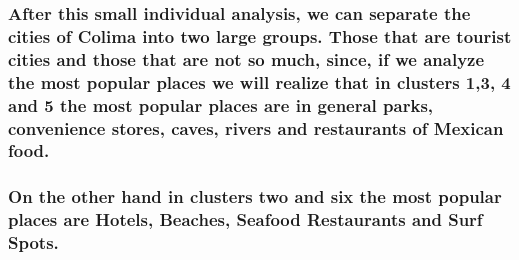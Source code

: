 \documentclass[11pt]{article}
\begin{document}
    \hypertarget{after-this-small-individual-analysis-we-can-separate-the-cities-of-colima-into-two-large-groups.-those-that-are-tourist-cities-and-those-that-are-not-so-much-since-if-we-analyze-the-most-popular-places-we-will-realize-that-in-clusters-13-4-and-5-the-most-popular-places-are-in-general-parks-convenience-stores-caves-rivers-and-restaurants-of-mexican-food.}{%
\subsubsection{After this small individual analysis, we can separate the
cities of Colima into two large groups. Those that are tourist cities
and those that are not so much, since, if we analyze the most popular
places we will realize that in clusters 1,3, 4 and 5 the most popular
places are in general parks, convenience stores, caves, rivers and
restaurants of Mexican
food.}\label{after-this-small-individual-analysis-we-can-separate-the-cities-of-colima-into-two-large-groups.-those-that-are-tourist-cities-and-those-that-are-not-so-much-since-if-we-analyze-the-most-popular-places-we-will-realize-that-in-clusters-13-4-and-5-the-most-popular-places-are-in-general-parks-convenience-stores-caves-rivers-and-restaurants-of-mexican-food.}}

\hypertarget{on-the-other-hand-in-clusters-two-and-six-the-most-popular-places-are-hotels-beaches-seafood-restaurants-and-surf-spots.}{%
\subsubsection{On the other hand in clusters two and six the most
popular places are Hotels, Beaches, Seafood Restaurants and Surf
Spots.}\label{on-the-other-hand-in-clusters-two-and-six-the-most-popular-places-are-hotels-beaches-seafood-restaurants-and-surf-spots.}}
\end{document}
